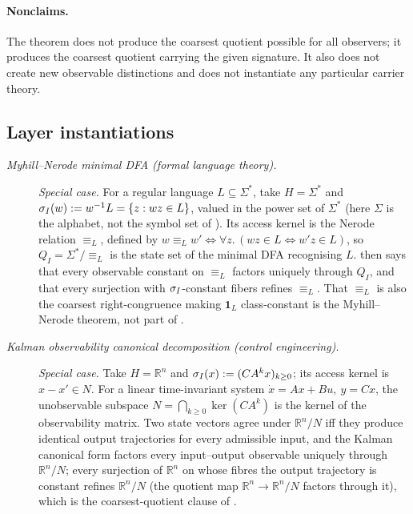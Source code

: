 \paragraph{Nonclaims.} The
theorem does not produce the coarsest quotient possible for all
observers; it produces the coarsest quotient carrying the given
signature.  It also does not create new observable distinctions and
does not instantiate any particular carrier theory.

\subsection*{Layer instantiations}\label{layer-inst:F10}

\begingroup\small
\begin{description}
\item[\emph{Myhill--Nerode minimal {DFA} (formal language theory).}] \textit{Special case.}
For a regular language \(L\subseteq\Sigma^*\), take \(H=\Sigma^*\) and
\(\sigma_I(w):=w^{-1}L=\{z:wz\in L\}\), valued in the power set of \(\Sigma^*\) (here \(\Sigma\) is the alphabet, not the symbol set of ). Its access kernel is the Nerode
relation \(\equiv_L\), defined by
\(w\equiv_L w'\Leftrightarrow\forall z.\,(wz\in L\Leftrightarrow w'z\in L)\),
so \(Q_I=\Sigma^*/\!\!\equiv_L\) is the state set of the minimal DFA
recognising \(L\).  then says that every observable constant on
\(\equiv_L\) factors uniquely through \(Q_I\), and that every surjection with
\(\sigma_I\)-constant fibers refines \(\equiv_L\). That \(\equiv_L\) is also the
coarsest right-congruence making \(\mathbf 1_L\) class-constant is the
Myhill--Nerode theorem, not part of 
\citep{Nerode1958LinearAutomatonTransformations}.

\item[\emph{Kalman observability canonical decomposition (control
engineering).}] \textit{Special case.}
Take \(H=\mathbb R^n\) and \(\sigma_I(x):=(CA^kx)_{k\ge0}\); its access kernel
is \(x-x'\in N\). For a linear time-invariant system \(\dot x=Ax+Bu,\ y=Cx\), the
unobservable subspace
\(N=\bigcap_{k\ge 0}\ker(CA^k)\) is the kernel of the observability
matrix.  Two state vectors agree under \(\mathbb R^n/N\) iff they
produce identical output trajectories for every admissible input,
and the Kalman canonical form factors every input--output
observable uniquely through \(\mathbb R^n/N\); every surjection of \(\mathbb R^n\) on whose fibres the output trajectory is constant refines \(\mathbb R^n/N\) (the quotient map \(\mathbb R^n\to\mathbb R^n/N\) factors through it), which is the coarsest-quotient clause of 
\citep{Kalman1963MathematicalDescription}.


\end{description}
